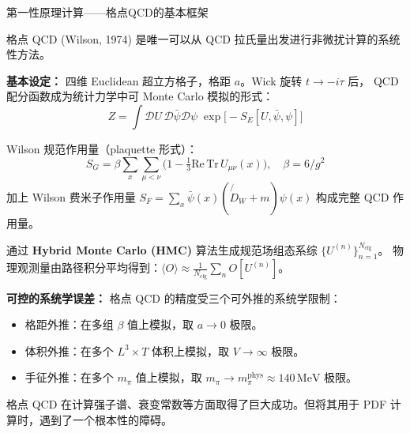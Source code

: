 \documentclass[10pt,aspectratio=169]{beamer}
\newcommand{\MeV}{\,\mathrm{MeV}}
\begin{document}
\begin{frame}{第一性原理计算——格点QCD的基本框架}

  格点 QCD (Wilson, 1974) 是唯一可以从 QCD 拉氏量出发进行非微扰计算的系统性方法。

  \textbf{基本设定：} 四维 Euclidean 超立方格子，格距 $a$。Wick 旋转 $t \to -i\tau$ 后，
  QCD 配分函数成为统计力学中可 Monte Carlo 模拟的形式：
  \begin{equation*}
    Z = \int \mathcal{D}U\, \mathcal{D}\bar{\psi}\mathcal{D}\psi\;
    \exp\!\bigl[-S_E[U,\bar{\psi},\psi]\bigr]
  \end{equation*}

  Wilson 规范作用量（plaquette 形式）：
  \begin{equation*}
    S_G = \beta \sum_x \sum_{\mu<\nu} \bigl(1 - \tfrac{1}{3}\mathrm{Re}\,\mathrm{Tr}\,U_{\mu\nu}(x)\bigr),
    \quad \beta = 6/g^2
  \end{equation*}
  加上 Wilson 费米子作用量 $S_F = \sum_x \bar{\psi}(x)(\not{D}_W + m)\psi(x)$ 构成完整 QCD 作用量。

  通过 \textbf{Hybrid Monte Carlo (HMC)} 算法生成规范场组态系综 $\{U^{(n)}\}_{n=1}^{N_{\mathrm{cfg}}}$。
  物理观测量由路径积分平均得到：$\langle O \rangle \approx \frac{1}{N_{\mathrm{cfg}}} \sum_n O[U^{(n)}]$。

  \textbf{可控的系统学误差：} 格点 QCD 的精度受三个可外推的系统学限制：
  \begin{itemize}
    \item 格距外推：在多组 $\beta$ 值上模拟，取 $a \to 0$ 极限。
    \item 体积外推：在多个 $L^3 \times T$ 体积上模拟，取 $V \to \infty$ 极限。
    \item 手征外推：在多个 $m_\pi$ 值上模拟，取 $m_\pi \to m_\pi^{\mathrm{phys}} \approx 140\MeV$ 极限。
  \end{itemize}

  格点 QCD 在计算强子谱、衰变常数等方面取得了巨大成功。但将其用于 PDF 计算时，遇到了一个根本性的障碍。\vspace{-6pt}
\end{frame}
\end{document}
